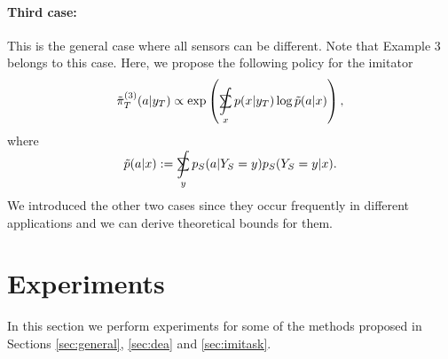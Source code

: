 \documentclass[letterpaper]{article} %
\theoremstyle{definition}%
\theoremstyle{definition}
\newcommand{\Obs}{Y}
\newcommand{\obs}{y}
\DeclareMathOperator*{\SumInt}{%
	\mathchoice%
	{\ooalign{$\sum$\cr\hidewidth$\displaystyle\int$\hidewidth\cr}}
	{\ooalign{\raisebox{.14\height}{\scalebox{.7}{$\textstyle\sum$}}\cr\hidewidth$\textstyle\int$\hidewidth\cr}}
	{\ooalign{\raisebox{.2\height}{\scalebox{.6}{$\scriptstyle\sum$}}\cr$\scriptstyle\int$\cr}}
	{\ooalign{\raisebox{.2\height}{\scalebox{.6}{$\scriptstyle\sum$}}\cr$\scriptstyle\int$\cr}}
}
\begin{document}
\paragraph{Third case:}
 This is the general case where all sensors can be different.
Note that Example 3 belongs to this case.
 Here, we propose the following policy for the imitator
$$
\tilde{\pi}^{(3)}_T(a|\obs_T) \propto \exp\left(\SumInt_{x}p(x|\obs_T)\log \tilde{p}(a|x)\right),
$$
where
$$
\tilde{p}(a|x):=\SumInt_\obs p_S(a|\Obs_S=y)p_S(\Obs_S=y|x).
$$
We introduced the other two cases since they occur frequently in different applications and we can derive theoretical bounds for them.


\section{Experiments}
\label{sec:exp}

In this section we perform experiments for some of the methods proposed in Sections \ref{sec:general}, \ref{sec:dea} and \ref{sec:imitask}.
\end{document}
